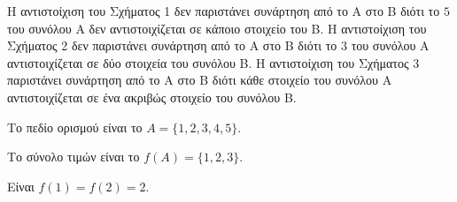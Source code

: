 
\begin{alist}
\item Η αντιστοίχιση του Σχήματος 1 δεν παριστάνει συνάρτηση από το Α στο Β διότι το $5$ του συνόλου Α δεν αντιστοιχίζεται σε κάποιο στοιχείο του Β.
Η αντιστοίχιση του Σχήματος 2 δεν παριστάνει συνάρτηση από το Α στο Β διότι το $3$ του συνόλου Α αντιστοιχίζεται σε δύο στοιχεία του συνόλου Β.
Η αντιστοίχιση του Σχήματος 3 παριστάνει συνάρτηση από το Α στο Β διότι κάθε στοιχείο του συνόλου Α αντιστοιχίζεται σε ένα ακριβώς στοιχείο του συνόλου Β.

\item 
\begin{rlist}
\item Το πεδίο ορισμού είναι το $A = \{1, 2, 3, 4, 5\}$.
\item Το σύνολο τιμών είναι το $f(A) = \{1, 2, 3\}$.
\item Είναι $f(1) = f(2) = 2$.
\end{rlist}
\end{alist}

